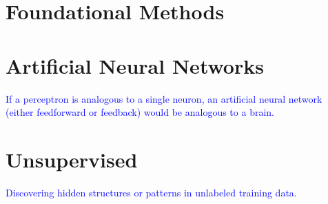 \chapter{Foundational Methods}

















\chapter{Artificial Neural Networks}

\textcolor{blue}{If a perceptron is analogous to a single neuron, an artificial neural network (either feedforward or feedback) would be analogous to a brain.}










\chapter{Unsupervised}

\textcolor{blue}{Discovering hidden structures or patterns in unlabeled training data.}






